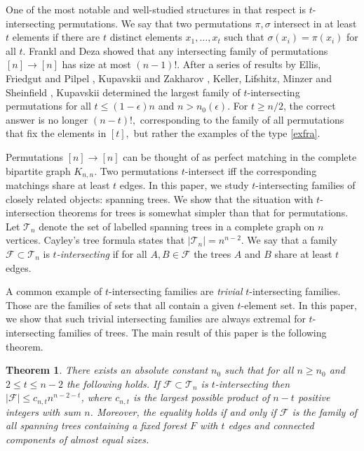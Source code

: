 \documentclass[11pt,letterpaper]{amsart}
\renewcommand{\le}{\leqslant}
\renewcommand{\ge}{\geqslant}
\newcommand{\ff}{\mathcal{F}}
\newcommand{\T}{\mathcal{T}}
\newtheorem{theorem}{Theorem}
\begin{document}
One of the most notable and well-studied structures in that respect is $t$-intersecting permutations. We say that two permutations $\pi,\sigma$ intersect in at least $t$ elements if there are $t$ distinct elements $x_1,\ldots, x_t$ such that $\sigma(x_i) = \pi(x_i)$ for all $t$. Frankl  and Deza showed that any intersecting family of permutations $[n]\to[n]$ has size at most $(n-1)!$. After a series of results by Ellis, Friedgut and Pilpel \cite{EFP}, Kupavskii and Zakharov \cite{spreads}, Keller, Lifshitz, Minzer and Sheinfield \cite{KLMS}, Kupavskii \cite{permutations} determined the largest family of $t$-intersecting permutations for all $t\le (1-\epsilon)n$ and $n>n_0(\epsilon)$. For $t\ge n/2$, the correct answer is no longer $(n-t)!,$ corresponding to the family of all permutations that fix the elements in $[t],$ but rather the examples of the type \eqref{exfra}.


Permutations $[n]\to [n]$ can be thought of as perfect matching in the complete bipartite graph $K_{n,n}.$ Two permutations $t$-intersect iff the corresponding matchings share at least $t$ edges. In this paper, we study $t$-intersecting families of closely related objects: spanning trees. We show that the situation with $t$-intersection theorems for trees is somewhat simpler than that for permutations.
Let $\T_n$ denote the set of labelled spanning trees in a complete graph on $n$ vertices. Cayley's tree formula states that $|\T_n| = n^{n-2}$. We say that a family $\ff \subset \T_n$ is \textit{$t$-intersecting} if for all $A, B \in \ff$ the  trees $A$ and $B$ share at least $t$ edges. 

A common example of $t$-intersecting families are \textit{trivial} $t$-intersecting families. Those are the families of sets that all contain a given $t$-element set. In this paper, we show that such trivial intersecting families are always extremal for $t$-intersecting families of trees.
The main result of this paper is the following theorem.

\begin{theorem}\label{thmbigt}
   There exists an absolute constant $n_0$ such that for all $n \ge n_0$ and $2 \le t \le n-2$ the following holds. If $\ff\subset \T_n$ is $t$-intersecting then $|\ff| \le c_{n, t}n^{n-2-t}$, where $c_{n, t}$ is the largest possible product of $n-t$ positive integers with sum $n$. Moreover, the equality holds if and only if $\ff$ is the family of all spanning trees containing a fixed forest $F$ with $t$ edges and connected components of almost equal sizes.
\end{theorem}
\end{document}
